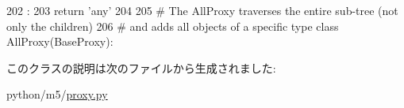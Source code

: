 \begin{DoxyCode}
202                   :
203         return 'any'
204 
205 # The AllProxy traverses the entire sub-tree (not only the children)
206 # and adds all objects of a specific type
class AllProxy(BaseProxy):
\end{DoxyCode}


このクラスの説明は次のファイルから生成されました:\begin{DoxyCompactItemize}
\item 
python/m5/\hyperlink{proxy_8py}{proxy.py}\end{DoxyCompactItemize}
